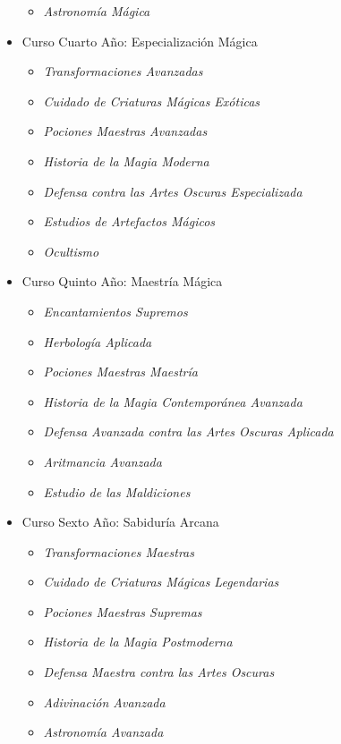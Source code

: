 \begin{itemize}
\begin{itemize}
      \item \textit{Astronomía Mágica}
    \end{itemize}
  \item Curso Cuarto Año: Especialización Mágica
    \begin{itemize}
      \item \textit{Transformaciones Avanzadas}
      \item \textit{Cuidado de Criaturas Mágicas Exóticas}
      \item \textit{Pociones Maestras Avanzadas}
      \item \textit{Historia de la Magia Moderna}
      \item \textit{Defensa contra las Artes Oscuras Especializada}
      \item \textit{Estudios de Artefactos Mágicos}
      \item \textit{Ocultismo}
    \end{itemize}
  \item Curso Quinto Año:  Maestría Mágica
    \begin{itemize}
      \item \textit{Encantamientos Supremos}
      \item \textit{Herbología Aplicada}
      \item \textit{Pociones Maestras Maestría}
      \item \textit{Historia de la Magia Contemporánea Avanzada}
      \item \textit{Defensa Avanzada contra las Artes Oscuras Aplicada}
      \item \textit{Aritmancia Avanzada}
      \item \textit{Estudio de las Maldiciones}
    \end{itemize}
  \item Curso Sexto Año: Sabiduría Arcana
    \begin{itemize}
      \item \textit{Transformaciones Maestras}
      \item \textit{Cuidado de Criaturas Mágicas Legendarias}
      \item \textit{Pociones Maestras Supremas}
      \item \textit{Historia de la Magia Postmoderna}
      \item \textit{Defensa Maestra contra las Artes Oscuras}
      \item \textit{Adivinación Avanzada}
      \item \textit{Astronomía Avanzada}
    \end{itemize}
\end{itemize}

